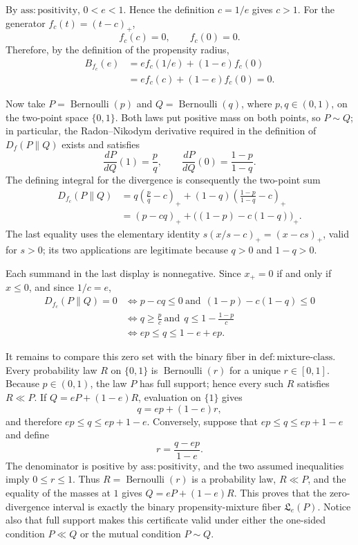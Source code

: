 By \(\mathrm{ass:positivity}\), \(0<e<1\).  Hence the definition
\(c=1/e\) gives \(c>1\).  For the generator \(f_c(t)=(t-c)_+\),
\[
f_c(c)=0,
\qquad
f_c(0)=0.
\]
Therefore, by the definition of the propensity radius,
\[
\begin{aligned}
B_{f_c}(e)
&=e f_c(1/e)+(1-e)f_c(0)\\
&=e f_c(c)+(1-e)f_c(0)=0.
\end{aligned}
\]

Now take \(P=\operatorname{Bernoulli}(p)\) and
\(Q=\operatorname{Bernoulli}(q)\), where \(p,q\in(0,1)\), on the
two-point space \(\{0,1\}\).  Both laws put positive mass on both points,
so \(P\sim Q\); in particular, the Radon--Nikodym derivative required in
the definition of \(D_f(P\|Q)\) exists and satisfies
\[
\frac{dP}{dQ}(1)=\frac{p}{q},
\qquad
\frac{dP}{dQ}(0)=\frac{1-p}{1-q}.
\]
The defining integral for the divergence is consequently the two-point
sum
\[
\begin{aligned}
D_{f_c}(P\|Q)
&=q\left(\frac{p}{q}-c\right)_+
 +(1-q)\left(\frac{1-p}{1-q}-c\right)_+\\
&=(p-cq)_+ +\bigl((1-p)-c(1-q)\bigr)_+.
\end{aligned}
\]
The last equality uses the elementary identity
\(s(x/s-c)_+=(x-cs)_+\), valid for \(s>0\); its two applications are
legitimate because \(q>0\) and \(1-q>0\).

Each summand in the last display is nonnegative.  Since \(x_+=0\) if and
only if \(x\leq 0\), and since \(1/c=e\),
\[
\begin{aligned}
D_{f_c}(P\|Q)=0
&\Longleftrightarrow p-cq\leq0
 \ \text{and}\ \ (1-p)-c(1-q)\leq0\\
&\Longleftrightarrow q\geq \frac{p}{c}
 \ \text{and}\ \ q\leq 1-\frac{1-p}{c}\\
&\Longleftrightarrow ep\leq q\leq 1-e+ep.
\end{aligned}
\]

It remains to compare this zero set with the binary fiber in
\(\mathrm{def:mixture\text{-}class}\).  Every probability law \(R\) on
\(\{0,1\}\) is \(\operatorname{Bernoulli}(r)\) for a unique
\(r\in[0,1]\).  Because \(p\in(0,1)\), the law \(P\) has full support;
hence every such \(R\) satisfies \(R\ll P\).  If
\(Q=eP+(1-e)R\), evaluation on \(\{1\}\) gives
\[
q=ep+(1-e)r,
\]
and therefore \(ep\leq q\leq ep+1-e\).  Conversely, suppose that
\(ep\leq q\leq ep+1-e\) and define
\[
r=\frac{q-ep}{1-e}.
\]
The denominator is positive by \(\mathrm{ass:positivity}\), and the two
assumed inequalities imply \(0\leq r\leq1\).  Thus
\(R=\operatorname{Bernoulli}(r)\) is a probability law, \(R\ll P\), and
the equality of the masses at \(1\) gives
\(Q=eP+(1-e)R\).  This proves that the zero-divergence interval is exactly
the binary propensity-mixture fiber \(\mathfrak L_e(P)\).  Notice also
that full support makes this certificate valid under either the one-sided
condition \(P\ll Q\) or the mutual condition \(P\sim Q\).

